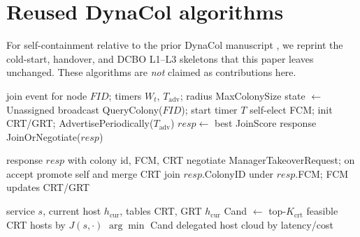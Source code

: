 \documentclass[11pt,a4paper]{article}
\begin{document}
\appendix
\section{Reused DynaCol algorithms}
\label{app:dynacol}

For self-containment relative to the prior DynaCol manuscript
\cite{nabati_dynacol_cluster2026}, we reprint the cold-start, handover, and
DCBO L1--L3 skeletons that this paper leaves unchanged. These algorithms are
\emph{not} claimed as contributions here.

\begin{algorithm}[t]
\caption{Cold-start join (Create\_And\_Add\_FogNode)}
\label{alg:cold}
\begin{algorithmic}[1]
\Require join event for node $FID$; timers $W_t$, $T_{\mathrm{adv}}$; radius MaxColonySize
\State state $\leftarrow$ Unassigned
\State broadcast QueryColony($FID$); start timer $T$
  \State self-elect FCM; init CRT/GRT; AdvertisePeriodically($T_{\mathrm{adv}}$)
\Else
  \State $resp\leftarrow$ best JoinScore response
    \State JoinOrNegotiate($resp$) 
  \EndIf
\EndIf
\end{algorithmic}
\end{algorithm}

\begin{algorithm}[t]
\caption{JoinOrNegotiate (potency-based FCM handover)}
\label{alg:handover}
\begin{algorithmic}[1]
\Require response $resp$ with colony id, FCM, CRT
  \State negotiate ManagerTakeoverRequest; on accept promote self and merge CRT
\Else
  \State join $resp$.ColonyID under $resp$.FCM; FCM updates CRT/GRT
\EndIf
\end{algorithmic}
\end{algorithm}

\begin{algorithm}[t]
\caption{DCBO\_PlaceService (L1--L3)}
\label{alg:dcbo}
\begin{algorithmic}[1]
\Require service $s$, current host $h_{\mathrm{cur}}$, tables CRT, GRT
  \State \Return $h_{\mathrm{cur}}$ 
\EndIf
\State Cand $\leftarrow$ top-$K_{\mathrm{crt}}$ feasible CRT hosts by $J(s,\cdot)$
  \State \Return $\arg\min$ Cand 
\EndIf
{}
    \State \Return delegated host 
  \EndIf
\EndFor
\State \Return cloud by latency/cost 
\end{algorithmic}
\end{algorithm}
\end{document}
